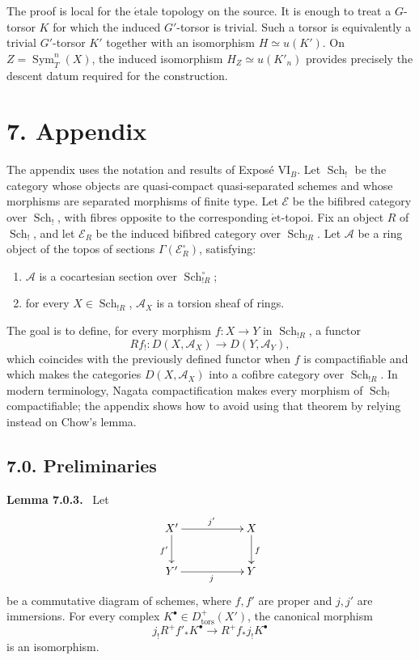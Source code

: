 \documentclass[12pt]{article}
\newcommand{\Aa}{\mathcal A}
\newcommand{\Ee}{\mathcal E}
\DeclareMathOperator{\Sch}{Sch}
\DeclareMathOperator{\Sym}{Sym}
\newcommand{\et}{\mathrm{\acute et}}
\newcommand{\tors}{\mathrm{tors}}
\newenvironment{statement}[1]{\par\medskip\noindent\textbf{#1.}\ }{\par\medskip}
\begin{document}
The proof is local for the \(\mathrm{\acute{e}tale}\) topology on the source. It is enough to treat a \(G\)-torsor \(K\) for which the induced \(G'\)-torsor is trivial. Such a torsor is equivalently a trivial \(G'\)-torsor \(K'\) together with an isomorphism \(H\simeq u(K')\). On \(Z=\Sym_T^n(X)\), the induced isomorphism \(H_Z\simeq u(K'_n)\) provides precisely the descent datum required for the construction.

\section*{7. Appendix}

The appendix uses the notation and results of Expos\'e VI\(_B\). Let \(\Sch_!\) be the category whose objects are quasi-compact quasi-separated schemes and whose morphisms are separated morphisms of finite type. Let \(\Ee\) be the bifibred category over \(\Sch_!\), with fibres opposite to the corresponding \(\et\)-topoi. Fix an object \(R\) of \(\Sch_!\), and let \(\Ee_R\) be the induced bifibred category over \(\Sch_{!R}\). Let \(\Aa\) be a ring object of the topos of sections \(\Gamma(\Ee_R^\circ)\), satisfying:
\begin{enumerate}[label=(\roman*)]
\item \(\Aa\) is a cocartesian section over \(\Sch_{!R}^\circ\);
\item for every \(X\in\Sch_{!R}\), \(\Aa_X\) is a torsion sheaf of rings.
\end{enumerate}
The goal is to define, for every morphism \(f:X\to Y\) in \(\Sch_{!R}\), a functor
\[
Rf_!:D(X,\Aa_X)\longrightarrow D(Y,\Aa_Y),
\]
which coincides with the previously defined functor when \(f\) is compactifiable and which makes the categories \(D(X,\Aa_X)\) into a cofibre category over \(\Sch_{!R}\). In modern terminology, Nagata compactification makes every morphism of \(\Sch_!\) compactifiable; the appendix shows how to avoid using that theorem by relying instead on Chow's lemma.

\subsection*{7.0. Preliminaries}

\begin{statement}{Lemma 7.0.3}
Let
\[
\xymatrix{X'\ar[rr]^{j'}\ar[d]_{f'}&&X\ar[d]^f\\Y'\ar[rr]_j&&Y}
\]
be a commutative diagram of schemes, where \(f,f'\) are proper and \(j,j'\) are immersions. For every complex \(K^\bullet\in D^+_{\tors}(X')\), the canonical morphism
\[
j_!R^+f'_*K^\bullet\longrightarrow R^+f_*j_!K^\bullet
\]
is an isomorphism.
\end{statement}
\end{document}
